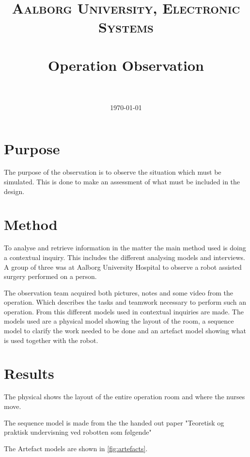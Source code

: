 \documentclass[paper=a4, fontsize=11pt]{scrartcl} %
\title{	
\normalfont \normalsize 
\textsc{Aalborg University, Electronic Systems} \\ [25pt] %
\horrule{0.5pt} \\[0.4cm] %
\huge Operation Observation \\ %
\horrule{2pt} \\[0.5cm] %
}
\date{\normalsize\today} %
\numberwithin{equation}{section} %
\numberwithin{figure}{section} %
\numberwithin{table}{section} %
\begin{document}
\maketitle %


\section{Purpose}
The purpose of the observation is to observe the situation which must be simulated. This is done to make an assessment of what must be included in the design.  

\section{Method}
To analyse and retrieve information in the matter the main method used is doing a contextual inquiry. This includes the different analysing models and interviews. A group of three was at Aalborg University Hospital to observe a robot assisted surgery performed on a person.

The observation team acquired both pictures, notes and some video from the operation. Which describes the tasks and teamwork necessary to perform such an operation. From this different models used in contextual inquiries are made. The models used are a physical model showing the layout of the room, a sequence model to clarify the work needed to be done and an artefact model showing what is used together with the robot.

\section{Results}
The physical shows the layout of the entire operation room and where the nurses move.

The sequence model is made from the the handed out paper "Teoretisk og praktisk undervisning ved robotten som følgende"

The Artefact models are shown in \autoref{fig:artefacts}.
\end{document}
